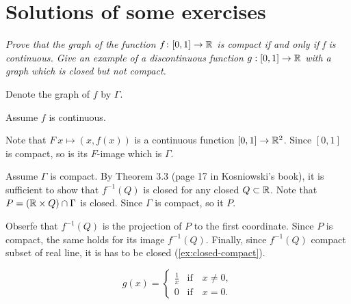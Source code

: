 \chapter{Solutions of some exercises}

\textit{Prove that the graph of the function $f\colon [0,1] \to \mathbb{R}$ is compact if and
only if f is continuous.
Give an example of a discontinuous function
$g: [0,1] \to \mathbb{R}$ with a graph which is closed but not compact.}

Denote the graph of $f$ by $\Gamma$.

Assume $f$ is continuous.

Note that $F\:x\mapsto (x,f(x))$ is a continuous function $[0,1]\to\mathbb{R}^2$.
Since $[0,1]$ is compact, so is its $F$-image which is $\Gamma$.


Assume $\Gamma$ is compact.
By Theorem 3.3 (page 17 in Kosniowski's book), it is sufficient to show that $f^{-1}(Q)$ is closed for any closed $Q\subset \mathbb{R}$.
Note that $P=(\mathbb{R}\times Q)\cap\Gamma$ is closed.
Since $\Gamma$ is compact, so it $P$.

Obserfe that $f^{-1}(Q)$ is the projection of $P$ to the first coordinate.
Since $P$ is compact, the same holds for its image $f^{-1}(Q)$.
Finally, since $f^{-1}(Q)$ compact subset of real line, it is has to be closed (\ref{ex:closed-compact}).

\[g(x)=
\begin{cases}
\tfrac1x&\text{if}\quad x\ne0,
\\
0&\text{if}\quad x=0.
\end{cases}
\]
